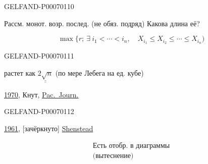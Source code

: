 \begin{GelfandAdjacentEvidence}{GELFAND-P000701}{10}


Рассм. монот. возр. послед. (не обяз. подряд) Какова длина её?

\[
\max\{r;\ \exists\ i_1<\cdots<i_n,\quad X_{i_1}\le X_{i_2}\le\cdots\le X_{i_n})
\]
\end{GelfandAdjacentEvidence}
\begin{GelfandAdjacentEvidence}{GELFAND-P000701}{11}


растет как \(\underline{\underline{2\sqrt n}}\) (по мере Лебега на ед. кубе)

\underline{1970}, Кнут, \href{https://msp.org/pjm/1970/34-3/pjm-v34-n3-p09-p.pdf}{Pac.\ Journ.}
\end{GelfandAdjacentEvidence}
\begin{GelfandAdjacentEvidence}{GELFAND-P000701}{12}


\underline{1961}, [зачёркнуто] \href{https://doi.org/10.4153/CJM-1961-015-3}{Shenstead}
\end{GelfandAdjacentEvidence}


\[
\begin{array}{||l}
\text{Есть отобр. в диаграммы}\\
\text{(вытеснение)}
\end{array}
\]


